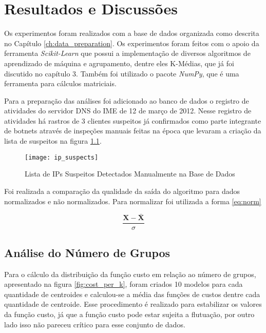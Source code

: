 \chapter{Resultados e Discussões}\label{ch:discussion}

Os experimentos foram realizados com a base de dados organizada como descrita no Capítulo \ref{ch:data_preparation}. Os experimentos foram feitos com o apoio da ferramenta \textit{Scikit-Learn} que possui a implementação de diversos algoritmos de aprendizado de máquina e agrupamento, dentre eles K-Médias, que já foi discutido no capítulo 3. Também foi utilizado o pacote \textit{NumPy}, que é uma ferramenta para cálculos matriciais.

Para a preparação das análises foi adicionado ao banco de dados o registro de atividades do servidor DNS do IME de 12 de março de 2012. Nesse registro de atividades há rastros de 3 clientes suspeitos já confirmados como parte integrante de botnets através de inspeções manuais feitas na época que levaram a criação da lista de suspeitos na figura \ref{fig:suspects}.

\begin{figure}[htbp]
\centering
\texttt{[image: ip\_suspects]}
\caption[Lista de IPs Suspeitos Detectados Manualmente na Base de Dados]{Lista de IPs Suspeitos Detectados Manualmente na Base de Dados} \label{fig:suspects}
\end{figure}

Foi realizada a comparação da qualidade da saída do algoritmo para dados normalizados e não normalizados. Para normalizar foi utilizada a forma \ref{eq:norm}

\begin{equation} \label{eq:norm}
\frac{\mathbf{X} - \mathbf{\bar{X}}}{\sigma}
\end{equation}

\section{Análise do Número de Grupos}

Para o cálculo da distribuição da função custo em relação ao número de grupos, apresentado na figura \ref{fig:cost_per_k}, foram criados 10 modelos para cada quantidade de centroides e calculou-se a média das funções de custos dentre cada quantidade de centroide. Esse procedimento é realizado para estabilizar os valores da função custo, já que a função custo pode estar sujeita a flutuação, por outro lado isso não pareceu crítico para esse conjunto de dados.

